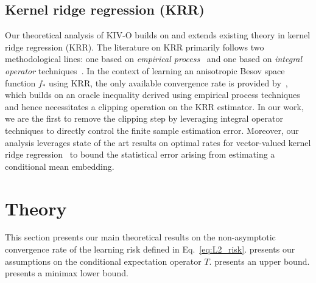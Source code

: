 \documentclass[11pt]{article}
\newcommand{\0}{\mathbf{0}}
\begin{document}
\subsection{Kernel ridge regression (KRR)} Our theoretical analysis of KIV-O builds on and extends existing theory in kernel ridge regression (KRR). The literature on KRR primarily follows two methodological lines: one based on \emph{empirical process}~\citep{steinwart2008support, steinwart2009optimal, eberts2013optimal, hang2021optimal, hamm2021adaptive} and one based on \emph{integral operator} techniques~\citep{de2005learning, smale2005shannon, smale2007learning, blanchard2018optimal, lin2020optimal, fischer2020sobolev, zhang2023optimality, zhang2024optimality}. 
In the context of learning an anisotropic Besov space function $f_\ast$ using KRR, the only available convergence rate is provided by~\citet{hang2021optimal}, which builds on an oracle inequality derived using empirical process techniques and hence necessitates a clipping operation on the KRR estimator. 
In our work, we are the first to remove the clipping step by leveraging integral operator techniques to directly control the finite sample estimation error.
Moreover, our analysis leverages state of the art results on optimal rates for vector-valued kernel ridge regression~\citep{JMLR:v25:23-1663,meunier2024optimalratesvectorvaluedspectral} to bound the statistical error arising from estimating a conditional mean embedding. %
\section{Theory}\label{sec:theory}
This section presents our main theoretical results on the non-asymptotic convergence rate of the learning risk defined in Eq.~\eqref{eq:L2_risk}.
 presents our assumptions on the conditional expectation operator $T$.
 presents an upper bound. 
 presents a minimax lower bound.
\end{document}
